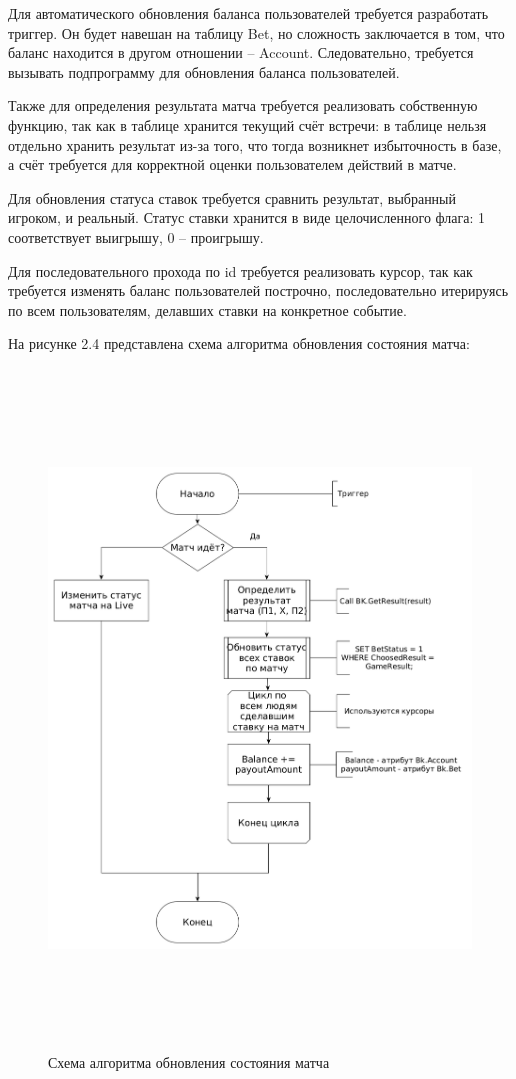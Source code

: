 Для автоматического обновления баланса пользователей требуется разработать триггер.
Он будет навешан на таблицу Bet, но сложность заключается в том, что баланс находится в другом отношении -- Account.
Следовательно, требуется вызывать подпрограмму для обновления баланса пользователей.

Также для определения результата матча требуется реализовать собственную функцию, так как в таблице хранится текущий счёт встречи: в таблице нельзя отдельно хранить результат из-за того, что тогда возникнет избыточность в базе, а счёт требуется для корректной оценки пользователем действий в матче. 

Для обновления статуса ставок требуется сравнить результат, выбранный игроком, и реальный. 
Статус ставки хранится в виде целочисленного флага: 1 соответствует выигрышу, 0 -- проигрышу.

Для последовательного прохода по id требуется реализовать курсор, так как требуется изменять баланс пользователей построчно, последовательно итерируясь по всем пользователям, делавших ставки на конкретное событие.

На рисунке 2.4 представлена схема алгоритма обновления состояния матча:
\FloatBarrier
\begin{figure}[hp]	
	\begin{center}
		\includegraphics[height=18cm, width=\linewidth]{inc/updateFlow.png}
	\end{center}
	\caption{Схема алгоритма обновления состояния матча}
	\label{fig::update}
\end{figure}
\FloatBarrier
